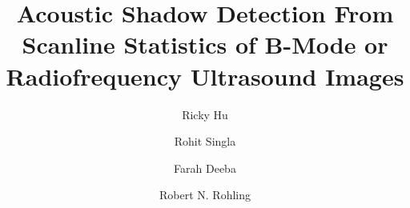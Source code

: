 \documentclass[preprint,5p,authoryear]{elsarticle}
\begin{document}
\begin{frontmatter}



\title{Acoustic Shadow Detection From Scanline Statistics of B-Mode or Radiofrequency Ultrasound Images}






\author[Affil1]{Ricky Hu }
\author[Affil1]{Rohit Singla}
\author[Affil1]{Farah Deeba}
\author[Affil1]{Robert N. Rohling}

\address[Affil1]{Robotics and Control Laboratory, Department of Electrical and Computer Engineering, University of British Columbia, Vancouver, Canada}



\end{frontmatter}
\end{document}
